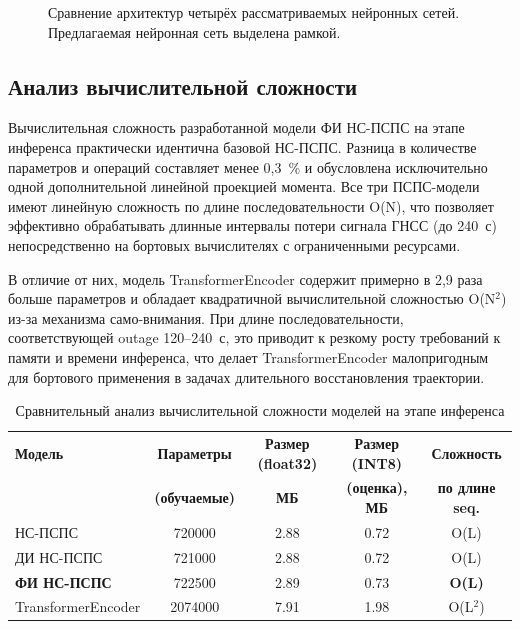 \begin{figure}
	\centering
	\resizebox{0.8\linewidth}{!}{}
	\caption{Сравнение архитектур четырёх рассматриваемых нейронных сетей.
		Предлагаемая нейронная сеть выделена рамкой.}
	\label{fig:compare}
\end{figure}

\subsection{Анализ вычислительной сложности}

Вычислительная сложность разработанной модели ФИ НС-ПСПС на этапе инференса практически идентична базовой НС-ПСПС. Разница в количестве параметров и операций составляет менее 0,3~\% и обусловлена исключительно одной дополнительной линейной проекцией момента. Все три ПСПС-модели имеют линейную сложность по длине последовательности O(N), что позволяет эффективно обрабатывать длинные интервалы потери сигнала ГНСС (до 240~с) непосредственно на бортовых вычислителях с ограниченными ресурсами.

В отличие от них, модель TransformerEncoder содержит примерно в 2,9 раза больше параметров и обладает квадратичной вычислительной сложностью O(N$^2$) из-за механизма само-внимания. При длине последовательности, соответствующей outage 120--240~с, это приводит к резкому росту требований к памяти и времени инференса, что делает TransformerEncoder малопригодным для бортового применения в задачах длительного восстановления траектории.

\begin{table}[htbp]
	\centering
	\footnotesize
	\caption{Сравнительный анализ вычислительной сложности моделей на этапе инференса}
	\label{tab:complexity_comparison}
	\begin{tabular}{|p{3.9cm}|c|c|c|c|}
		\hline
		\textbf{Модель} & 
		\textbf{Параметры} & 
		\textbf{Размер (float32)} & 
		\textbf{Размер (INT8)} & 
		\textbf{Сложность} \\
		& \textbf{(обучаемые)} & \textbf{МБ} & \textbf{(оценка), МБ} & \textbf{по длине seq.} \\
		\hline
		НС-ПСПС & \num{720000} & \num{2.88} & \num{0.72} & O(L) \\
		\hline
		ДИ НС-ПСПС & \num{721000} & \num{2.88} & \num{0.72} & O(L) \\
		\hline
		\textbf{ФИ НС-ПСПС} & \num{722500} & \num{2.89} & \num{0.73} & \textbf{O(L)} \\
		\hline
		TransformerEncoder & \num{2074000} & \num{7.91} & \num{1.98} & O(L$^2$) \\
		\hline
	\end{tabular}
\end{table}


